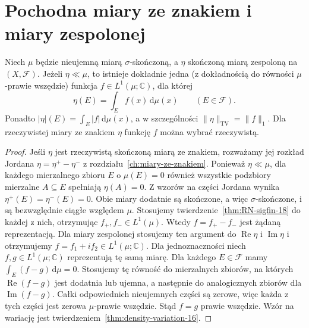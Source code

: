 \section{Pochodna miary ze znakiem i miary zespolonej}
\begin{twierdzenie}
\label{thm:RN-complex-18}
Niech $\mu$ będzie nieujemną miarą $\sigma$-skończoną,
a $\eta$ skończoną miarą zespoloną na $(X,\mathcal F)$.
Jeżeli $\eta\ll\mu$, to istnieje dokładnie jedna
(z dokładnością do równości $\mu$-prawie wszędzie)
funkcja $f\in L^1(\mu;\mathbb C)$, dla której
\begin{equation}\label{eq:RN-complex-18}
\eta(E)=\int_E f(x)\,\mathrm d\mu(x)
\qquad(E\in\mathcal F).
\end{equation}
Ponadto $|\eta|(E)=\int_E|f|\,\mathrm d\mu(x)$,
a w szczególności $\|\eta\|_{\mathrm{TV}}=\|f\|_1$.
Dla rzeczywistej miary ze znakiem $\eta$ funkcję $f$
można wybrać rzeczywistą.
\end{twierdzenie}
\begin{proof}
Jeśli $\eta$ jest rzeczywistą skończoną miarą ze znakiem,
rozważamy jej rozkład Jordana
$\eta=\eta^+-\eta^-$ z rozdziału~\ref{ch:miary-ze-znakiem}.
Ponieważ $\eta\ll\mu$, dla każdego mierzalnego
zbioru $E$ o $\mu(E)=0$ również wszystkie podzbiory
mierzalne $A\subseteq E$ spełniają $\eta(A)=0$.
Z wzorów na części Jordana wynika
$\eta^+(E)=\eta^-(E)=0$. Obie miary dodatnie są
skończone, a więc $\sigma$-skończone, i są
bezwzględnie ciągłe względem $\mu$.
Stosujemy twierdzenie~\ref{thm:RN-sigfin-18} do każdej
z nich, otrzymując $f_+,f_-\in L^1(\mu)$.
Wtedy $f=f_+-f_-$ jest żądaną reprezentacją.
Dla miary zespolonej stosujemy ten argument do
$\operatorname{Re}\eta$ i $\operatorname{Im}\eta$
i otrzymujemy $f=f_1+if_2\in L^1(\mu;\mathbb C)$.
Dla jednoznaczności niech $f,g\in L^1(\mu;\mathbb C)$
reprezentują tę samą miarę. Dla każdego $E\in\mathcal F$
mamy $\int_E(f-g)\,\mathrm d\mu=0$. Stosujemy tę równość
do mierzalnych zbiorów, na których $\operatorname{Re}(f-g)$
jest dodatnia lub ujemna, a następnie do analogicznych
zbiorów dla $\operatorname{Im}(f-g)$. Całki odpowiednich
nieujemnych części są zerowe, więc każda z tych części
jest zerowa $\mu$-prawie wszędzie. Stąd $f=g$ prawie
wszędzie. Wzór na wariację jest twierdzeniem~\ref{thm:density-variation-16}.
\end{proof}

